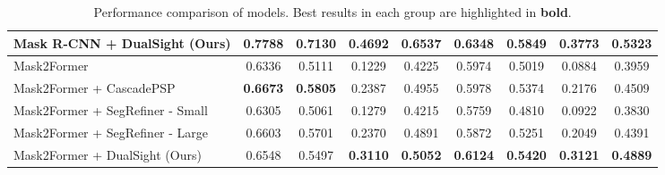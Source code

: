 \begin{table*}[h!]
\begin{adjustbox}{width=\textwidth}
\begin{tabular}{@{}l|c|c|c|c|c|c|c|c@{}}
Mask R-CNN + DualSight (Ours) & \textbf{0.7788} & \textbf{0.7130} & \textbf{0.4692} & \textbf{0.6537} & \textbf{0.6348} & \textbf{0.5849} & \textbf{0.3773} & \textbf{0.5323} \\
\midrule
Mask2Former & 0.6336 & 0.5111 & 0.1229 & 0.4225 & 0.5974 & 0.5019 & 0.0884 & 0.3959 \\
Mask2Former + CascadePSP & \textbf{0.6673} & \textbf{0.5805} & 0.2387 & 0.4955 & 0.5978 & 0.5374 & 0.2176 & 0.4509 \\
Mask2Former + SegRefiner - Small & 0.6305 & 0.5061 & 0.1279 & 0.4215 & 0.5759 & 0.4810 & 0.0922 & 0.3830 \\
Mask2Former + SegRefiner - Large & 0.6603 & 0.5701 & 0.2370 & 0.4891 & 0.5872 & 0.5251 & 0.2049 & 0.4391 \\
Mask2Former + DualSight (Ours) & 0.6548 & 0.5497 & \textbf{0.3110} & \textbf{0.5052} & \textbf{0.6124} & \textbf{0.5420} & \textbf{0.3121} & \textbf{0.4889} \\
\bottomrule
\end{tabular}
\end{adjustbox}
\caption{Performance comparison of models. Best results in each group are highlighted in \textbf{bold}.}
\label{tab:performance_comparison}
\end{table*}
